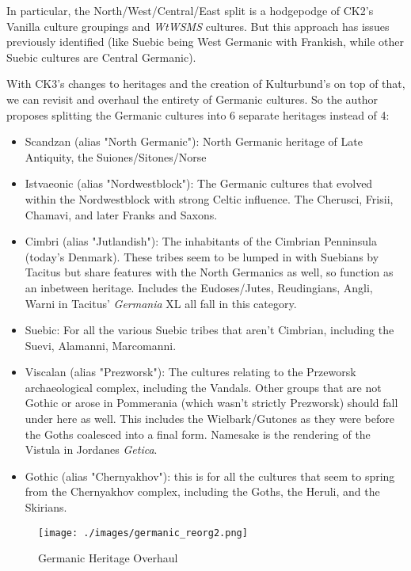 \documentclass{article}
\begin{document}
	In particular, the North/West/Central/East split is a hodgepodge of CK2's Vanilla culture groupings and \textit{WtWSMS} cultures.
	But this approach has issues previously identified (like Suebic being West Germanic with Frankish, while other Suebic cultures are Central Germanic).
	
	With CK3's changes to heritages and the creation of Kulturbund's on top of that, we can revisit and overhaul the entirety of Germanic cultures.
	So the author proposes splitting the Germanic cultures into 6 separate heritages instead of 4:
	
	\begin{itemize}
		\item Scandzan (alias "North Germanic"):  North Germanic heritage of Late Antiquity, the Suiones/Sitones/Norse
		\item Istvaeonic (alias "Nordwestblock"): The Germanic cultures that evolved within the Nordwestblock with strong Celtic influence.
		The Cherusci, Frisii, Chamavi, and later Franks and Saxons.
		\item Cimbri (alias "Jutlandish"): The inhabitants of the Cimbrian Penninsula (today's Denmark).
		These tribes seem to be lumped in with Suebians by Tacitus but share features with the North Germanics as well, so function as an inbetween heritage.
		Includes the Eudoses/Jutes, Reudingians, Angli, Warni in Tacitus' \textit{Germania} XL all fall in this category.
		\item Suebic: For all the various Suebic tribes that aren't Cimbrian, including the Suevi, Alamanni, Marcomanni.
		\item Viscalan (alias "Prezworsk"): The cultures relating to the Przeworsk archaeological complex, including the Vandals.
		Other groups that are not Gothic or arose in Pommerania (which wasn't strictly Prezworsk) should fall under here as well.
		This includes the Wielbark/Gutones as they were before the Goths coalesced into a final form.
		Namesake is the rendering of the Vistula in Jordanes \textit{Getica}.
		\item Gothic (alias "Chernyakhov"): this is for all the cultures that seem to spring from the Chernyakhov complex, including the Goths, the Heruli, and the Skirians.
	\end{itemize}
	
	\begin{figure}[h!]
		\centering
		\texttt{[image: ./images/germanic\_reorg2.png]}
		\caption{Germanic Heritage Overhaul}
	\end{figure}
	
\end{document}
